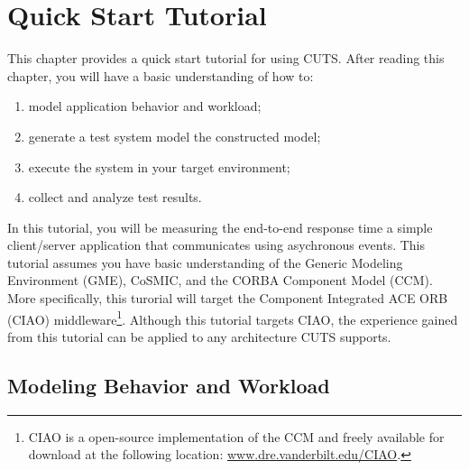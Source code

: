 
\chapter{Quick Start Tutorial}

This chapter provides a quick start tutorial for using CUTS. After reading this
chapter, you will have a basic understanding of how to:
\begin{enumerate}
  \item model application behavior and workload;

  \item generate a test system model the constructed model;

  \item execute the system in your target environment;

  \item collect and analyze test results.
\end{enumerate}
In this tutorial, you will be measuring the end-to-end response time a simple
client/\-server application that communicates using asychronous events. This
tutorial assumes you have basic understanding of the Generic Modeling 
Environment (GME), CoSMIC, and the CORBA Component Model (CCM). More specifically,
this turorial will target the Component Integrated ACE ORB (CIAO) 
middleware\footnote{CIAO is a open-source implementation of the CCM and freely 
available for download at the following location: \url{www.dre.vanderbilt.edu/CIAO}.}.
Although this tutorial targets CIAO, the experience gained from
this tutorial can be applied to any architecture CUTS supports.

\section{Modeling Behavior and Workload}
\label{sec:quickstart-modeling}

